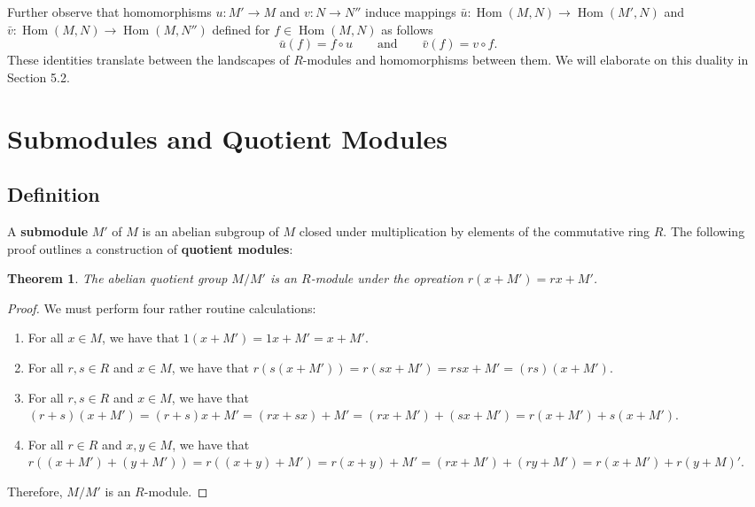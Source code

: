 \documentclass[11pt]{article}
\newtheorem{theorem}{Theorem}
\newcommand{\Hom}{\operatorname{Hom}}
\begin{document}
Further observe that homomorphisms $u : M' \to M$ and $v : N \to N''$ induce mappings $\bar{u} : \Hom(M, N) \to \Hom(M', N)$ and $\bar{v} : \Hom(M, N) \to \Hom(M, N'')$ defined for $f \in \Hom(M, N)$ as follows
\[
	\bar{u}(f) = f \circ u \qquad \text{and} \qquad \bar{v}(f) = v \circ f.
\]
These identities translate between the landscapes of $R$-modules and homomorphisms between them. We will elaborate on this duality in Section 5.2.

\newpage


\section{Submodules and Quotient Modules}


\subsection{Definition}

A \textbf{submodule} $M'$ of $M$ is an abelian subgroup of $M$ closed under multiplication by elements of the commutative ring $R$. The following proof outlines a construction of \textbf{quotient modules}:

\begin{adjustwidth}{1cm}{}
	\begin{theorem}
		The abelian quotient group $M / M'$ is an $R$-module under the opreation $r(x + M') = rx + M'$.
	\end{theorem}
	\begin{proof}
		We must perform four rather routine calculations:
		\begin{enumerate}
			\item For all $x \in M$, we have that $1(x + M') = 1x + M' = x + M'$.
			\item For all $r, s \in R$ and $x \in M$, we have that $r(s(x + M')) = r(sx + M') = rsx + M' = (rs)(x + M')$.
			\item For all $r, s \in R$ and $x \in M$, we have that $(r + s)(x + M') = (r + s)x + M' = (rx + sx) + M' = (rx + M') + (sx + M') = r(x + M') + s(x + M')$.
			\item For all $r \in R$ and $x, y \in M$, we have that $r((x + M') + (y + M')) = r((x + y) + M') = r(x + y) + M' = (rx + M') + (ry + M') = r(x + M') + r(y + M)'$.
		\end{enumerate}
		Therefore, $M / M'$ is an $R$-module.
	\end{proof}
\end{adjustwidth}
\end{document}
